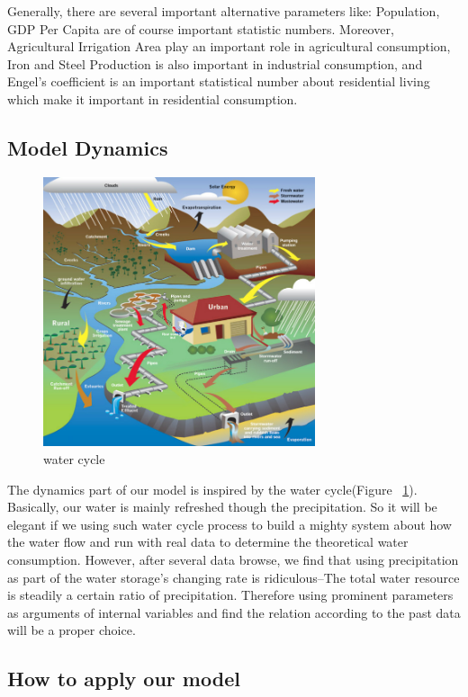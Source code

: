     Generally, there are several important alternative parameters like: Population, GDP Per Capita are of course important statistic numbers. Moreover, Agricultural Irrigation Area play an important role in agricultural consumption, Iron and Steel Production is also important in industrial consumption, and Engel's coefficient is an important statistical number about residential living which make it important in residential consumption.

  \subsection{Model Dynamics}

    \begin{figure}
    \includegraphics[width = 8cm]{picture/UrbanWaterCycle.jpg}
    \caption{water cycle\cite{WaterCycle}}
    \label{water cycle}
    \end{figure}
    The dynamics part of our model is inspired by the water cycle(Figure ~\ref{water cycle}). Basically, our water is mainly refreshed though the precipitation. So it will be elegant if we using such water cycle process to build a mighty system about how the water flow and run with real data to determine the theoretical water consumption. However, after several data browse, we find that using precipitation as part of the water storage's changing rate is ridiculous--The total water resource is steadily a certain ratio of precipitation. Therefore using prominent parameters as arguments of internal variables and find the relation according to the past data will be a proper choice.

  \subsection{How to apply our model}

